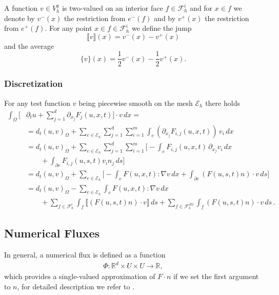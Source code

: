 \documentclass[a4paper,12pt]{article}
\theoremstyle{definition}
\theoremstyle{definition}
\newcommand{\Dim}{d}
\begin{document}
A function $v\in V_h^q$ is two-valued on an interior face $f\in\mathcal{F}_h^i$ and
for $x\in f$ we denote by $v^-(x)$ the restriction from $e^-(f)$ and by 
$v^+(x)$ the restriction from $e^+(f)$.
For any point $x\in f \in \mathcal{F}_h^i$ we define the jump
\begin{equation}
\llbracket v \rrbracket (x) = v^-(x)-v^+(x)
\end{equation}
and the average
\begin{equation}
\{ v \} (x) = \frac12 v^-(x) - \frac12 v^+(x) .
\end{equation}


\subsubsection*{Discretization}

For any test function $v$ being piecewise smooth
on the mesh $\mathcal{E}_h$ there holds
\begin{equation}\label{eq:DG_identity}
\begin{split}
\int_\Omega \biggl[&\partial_t u + \sum_{j=1}^{\Dim}\partial_{x_j}F_j(u,x,t)\biggr]\cdot v \,dx = \\
&= d_t (u,v)_\Omega + \sum_{e\in\mathcal{E}_h} \sum_{j=1}^{\Dim} \sum_{i=1}^m
\int_e (\partial_{x_j}F_{i,j}(u,x,t)) \, v_i \,dx \\
&= d_t (u,v)_\Omega + \sum_{e\in\mathcal{E}_h} \sum_{j=1}^{\Dim} \sum_{i=1}^m
\biggl[ - \int_e F_{i,j}(u,x,t) \,\partial_{x_j} v_i \,dx \\
&\qquad+ \int_{\partial e} F_{i,j}(u,s,t) v_i n_j\,ds \biggr]\\
&= d_t (u,v)_\Omega + \sum_{e\in\mathcal{E}_h}  \biggl[-\int_e F(u,x,t) : \nabla v\,dx
+ \int_{\partial e} (F(u,s,t)n)\cdot v\,ds\biggr]\\
&= d_t (u,v)_\Omega - \sum_{e\in\mathcal{E}_h} \int_e F(u,x,t) : \nabla v\,dx\\
&\qquad + \sum_{f\in\mathcal{F}_h^i} \int_f \llbracket (F(u,s,t)n)\cdot v \rrbracket \,ds
+ \sum_{f\in\mathcal{F}_h^{\partial\Omega}} \int_f (F(u,s,t)n)\cdot v \,ds \,.
\end{split}
\end{equation}

\subsection{Numerical Fluxes}

In general, a numerical flux is defined as a function
\begin{align}
\Phi :  \mathbb{R}^d \times U \times U \rightarrow \mathbb{R},
\end{align}
which provides a single-valued approximation of $F \cdot n$ if we set the first argument to $n$, for detailed description we refer to \cite{DiPietro}.
\end{document}
